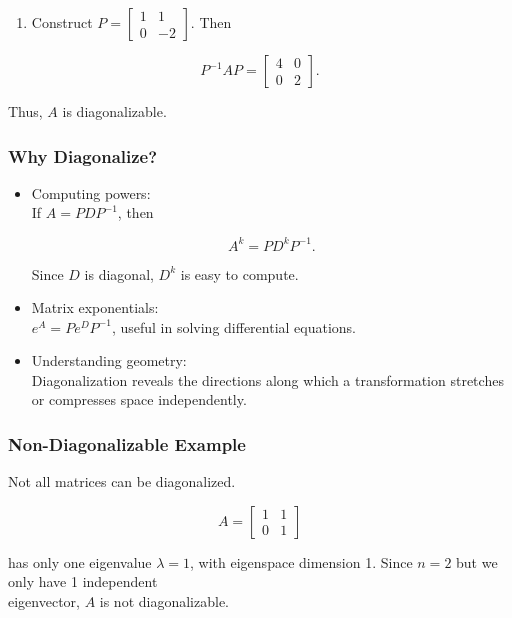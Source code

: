 \documentclass[
  12pt,
  a4paper,
]{article}
\begin{document}
\begin{enumerate}
\def\labelenumi{\arabic{enumi}.}
\item
  Construct \(P = \begin{bmatrix} 1 & 1 \\ 0 & -2 \end{bmatrix}\). Then
\end{enumerate}

\[P^{-1} A P = \begin{bmatrix} 4 & 0 \\ 0 & 2 \end{bmatrix}.\]

Thus, \(A\) is diagonalizable.

\subsubsection{Why Diagonalize?}\label{why-diagonalize}

\begin{itemize}
\item
  Computing powers:\\
  If \(A = P D P^{-1}\), then

  \[A^k = P D^k P^{-1}.\]

  Since \(D\) is diagonal, \(D^k\) is easy to compute.
\item
  Matrix exponentials:\\
  \(e^A = P e^D P^{-1}\), useful in solving differential equations.
\item
  Understanding geometry:\\
  Diagonalization reveals the directions along which a transformation
  stretches or compresses space independently.
\end{itemize}

\subsubsection{Non-Diagonalizable
Example}\label{non-diagonalizable-example}

Not all matrices can be diagonalized.

\[A = \begin{bmatrix} 1 & 1 \\ 0 & 1 \end{bmatrix}\]

has only one eigenvalue \(\lambda = 1\), with eigenspace dimension 1.
Since \(n=2\) but we only have 1 independent\\
eigenvector, \(A\) is not diagonalizable.
\end{document}
